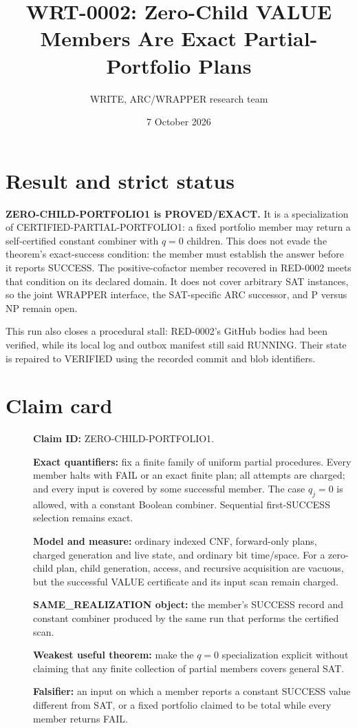 \documentclass[11pt]{article}
\title{WRT-0002: Zero-Child VALUE Members Are Exact Partial-Portfolio Plans}
\author{WRITE, ARC/WRAPPER research team}
\date{7 October 2026}
\begin{document}
\maketitle

\section{Result and strict status}
\textbf{ZERO-CHILD-PORTFOLIO1 is PROVED/EXACT.}  It is a specialization of
CERTIFIED-PARTIAL-PORTFOLIO1: a fixed portfolio member may return a
self-certified constant combiner with $q=0$ children.  This does not evade
the theorem's exact-success condition: the member must establish the answer
before it reports SUCCESS.  The positive-cofactor member recovered in
RED-0002 meets that condition on its declared domain.  It does not cover
arbitrary SAT instances, so the joint WRAPPER interface, the SAT-specific ARC
successor, and P versus NP remain open.

This run also closes a procedural stall: RED-0002's GitHub bodies had been
verified, while its local log and outbox manifest still said RUNNING.  Their
state is repaired to VERIFIED using the recorded commit and blob identifiers.

\section{Claim card}
\begin{description}
\item[] \textbf{Claim ID:} ZERO-CHILD-PORTFOLIO1.
\item[] \textbf{Exact quantifiers:} fix a finite family of uniform partial
procedures.  Every member halts with FAIL or an exact finite plan; all
attempts are charged; and every input is covered by some successful member.
The case $q_j=0$ is allowed, with a constant Boolean combiner.  Sequential
first-SUCCESS selection remains exact.
\item[] \textbf{Model and measure:} ordinary indexed CNF, forward-only plans,
charged generation and live state, and ordinary bit time/space.  For a
zero-child plan, child generation, access, and recursive acquisition are
vacuous, but the successful VALUE certificate and its input scan remain
charged.
\item[] \textbf{SAME\_REALIZATION object:} the member's SUCCESS record and
constant combiner produced by the same run that performs the certified scan.
\item[] \textbf{Weakest useful theorem:} make the $q=0$ specialization
explicit without claiming that any finite collection of partial members
covers general SAT.
\item[] \textbf{Falsifier:} an input on which a member reports a constant
SUCCESS value different from SAT, or a fixed portfolio claimed to be total
while every member returns FAIL.
\end{description}
\end{document}
